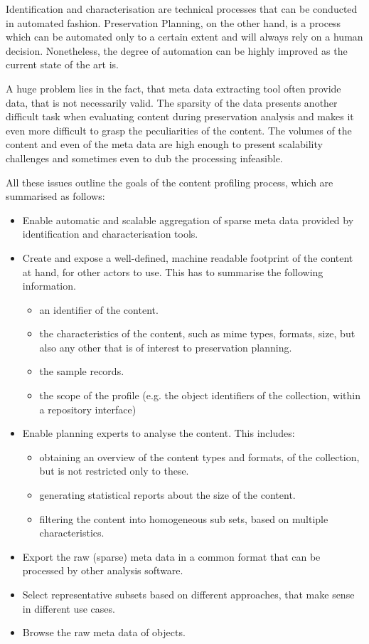 Identification and characterisation are technical processes that can be conducted in automated fashion. Preservation Planning, on the other hand, is a process which can be automated only to a certain extent and will always rely on a human decision. Nonetheless, the degree of automation can be highly improved as the current state of the art is. 

A huge problem lies in the fact, that meta data extracting tool often provide data, that is not necessarily valid. The sparsity of the data presents another difficult task when evaluating content during preservation analysis and makes it even more difficult to grasp the peculiarities of the content. The volumes of the content and even of the meta data are high enough to present scalability challenges and sometimes even to dub the processing infeasible.

All these issues outline the goals of the content profiling process, which are summarised as follows:

\begin{itemize}
\item Enable automatic and scalable aggregation of sparse meta data provided by identification and characterisation tools.
\item Create and expose a well-defined, machine readable footprint of the content at hand, for other actors to use. This has to summarise the following information.
 \begin{itemize}
  \item an identifier of the content.
  \item the characteristics of the content, such as mime types, formats, size, but also any other that is of interest to preservation planning.
  \item the sample records.
  \item the scope of the profile (e.g. the object identifiers of the collection, within a repository interface)
 \end{itemize}
\item Enable planning experts to analyse the content. This includes:
 \begin{itemize}
  \item obtaining an overview of the content types and formats, of the collection, but is not restricted only to these.
  \item generating statistical reports about the size of the content.
  \item filtering the content into homogeneous sub sets, based on multiple characteristics.
 \end{itemize}
\item Export the raw (sparse) meta data in a common format that can be processed by other analysis software.
\item Select representative subsets based on different approaches, that make sense in different use cases.
\item Browse the raw meta data of objects.
\end{itemize}

